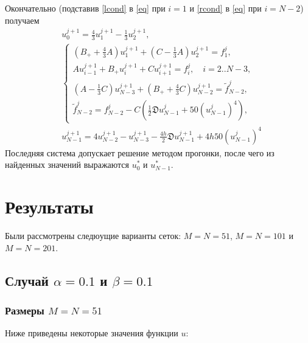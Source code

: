 \documentclass[a4paper,12pt]{article}
\begin{document}
Окончательно (подставив \cref{lcond} в \cref{eq} при \(i=1\) и \cref{rcond} в \cref{eq} при \(i=N-2\)) получаем
\begin{align*}
   & u_{0}^{j+1} = \frac{4}{3}u_{1}^{j+1} - \frac{1}{3} u_{2}^{j+1},                                                                         \\
   & \begin{cases}
       \left(B_{+} + \frac{4}{3}A\right) u_{1}^{j+1} + \left(C - \frac{1}{3}A\right) u_{2}^{j+1} = f_{1}^{j},               \\
       A u_{i-1}^{j+1} + B_{+} u_{i}^{j+1} + C u_{i+1}^{j+1} =  f_{i}^{j}, \quad i=2..N-3,                                  \\
       \left(A - \frac{1}{3}C\right) u_{N-3}^{j+1} + \left(B_{+} + \frac{4}{3}C\right) u_{N-2}^{j+1} = \tilde{f}_{N-2}^{j}, \\
       \tilde{f}_{N-2}^{j} = f_{N-2}^{j} - C\left(\frac{1}{2}\mathfrak{D} u_{N-1}^{j} + 50\left(u_{N-1}^{j}\right)^4\right),
     \end{cases} \\
   & u_{N-1}^{j+1}= 4u_{N-2}^{j+1} - u_{N-3}^{j+1}-\frac{4h}{2}\mathfrak{D} u_{N-1}^{j+1} + 4h50\left(u_{N-1}^{j}\right)^4 
\end{align*}
Последняя система допускает решение методом прогонки, после чего из найденных значений выражаются \(u_{0}^{*}\) и \(u_{N-1}^{*}\).
\section*{Результаты}
Были рассмотрены следюущие варианты сеток: \(M=N=51\), \(M=N=101\) и \(M=N=201\).

\subsection*{Случай \(\alpha=0.1\) и \(\beta=0.1\)}

\subsubsection*{Размеры \(M=N=51\)}

Ниже приведены некоторые значения функции \(u\):
\end{document}
